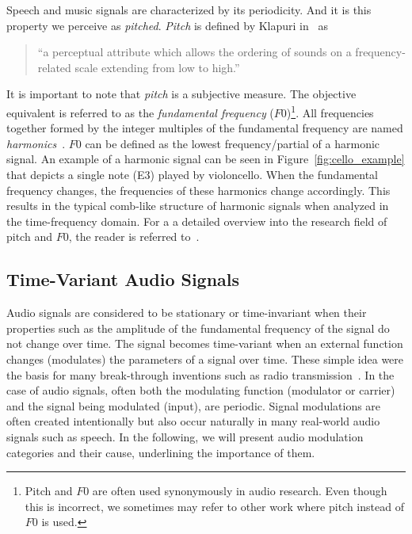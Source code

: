Speech and music signals are characterized by its periodicity.
And it is this property we perceive as \emph{pitched}.
\emph{Pitch} is defined by Klapuri in~\cite{klapuri06book} as 

\begin{quote}
``a perceptual attribute which allows the ordering of sounds on a frequency-related scale extending from low to high.''
\end{quote}

It is important to note that \emph{pitch} is a subjective measure.
The objective equivalent is referred to as the \emph{fundamental frequency} (\(F0\))\footnote{Pitch and $F0$ are often used synonymously in audio research. 
Even though this is incorrect, we sometimes may refer to other work where pitch instead of $F0$ is used.}.
All frequencies together formed by the integer multiples of the fundamental frequency are named \textit{harmonics}~\cite{schenker54}.
\(F0\) can be defined as the lowest frequency/partial of a harmonic signal.
An example of a harmonic signal can be seen in Figure~\ref{fig:cello_example} that depicts a single note (E3) played by violoncello.
When the fundamental frequency changes, the frequencies of these harmonics change accordingly.
This results in the typical comb-like structure of harmonic signals when analyzed in the time-frequency domain.
For a a detailed overview into the research field of pitch and \(F0\), the reader is referred to~\cite{klapuri06book}.

\subsection{Time-Variant Audio Signals}\label{sub:time-variant-audio-signals}

Audio signals are considered to be stationary or time-invariant when their properties such as the amplitude of the fundamental frequency of the signal do not change over time.
The signal becomes time-variant when an external function changes (modulates) the parameters of a signal over time.
These simple idea were the basis for many break-through inventions such as radio transmission~\cite{shannon48}.
In the case of audio signals, often both the modulating function (modulator or carrier) and the signal being modulated (input), are periodic.
Signal modulations are often created intentionally but also occur naturally in many real-world audio signals such as speech.
In the following, we will present audio modulation categories and their cause, underlining the importance of them.

